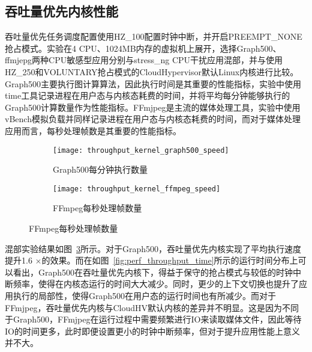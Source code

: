 \subsection{吞吐量优先内核性能}


吞吐量优先任务调度配置使用HZ\_100配置时钟中断，并开启PREEMPT\_NONE抢占模式。实验在4 CPU、1024MB内存的虚拟机上展开，选择Graph500、ffmjepg两种CPU敏感型应用分别与stress\_ng CPU干扰应用混部，并与使用HZ\_250和VOLUNTARY抢占模式的CloudHypervisor默认Linux内核进行比较。Graph500主要执行图计算算法，因此执行时间是其重要的性能指标，实验中使用time工具记录进程在用户态与内核态耗费的时间，并将平均每分钟能够执行的Graph500计算数量作为性能指标。FFmjpeg是主流的媒体处理工具，实验中使用vBench模拟负载并同样记录进程在用户态与内核态耗费的时间，而对于媒体处理应用而言，每秒处理帧数是其重要的性能指标。

\begin{figure}[H]
    \centering
    \begin{subfigure}[b]{0.35\textwidth}
        \texttt{[image: throughput\_kernel\_graph500\_speed]}
        \caption{\quad Graph500每分钟执行数量}
        \label{fig:throughput_kernel_graph500_speed}
    \end{subfigure}
    \begin{subfigure}[b]{0.35\textwidth}
        \texttt{[image: throughput\_kernel\_ffmpeg\_speed]}
        \caption{\quad FFmpeg每秒处理帧数量}
        \label{fig:throughput_kernel_ffmpeg_speed}
    \end{subfigure}
    \label{fig:perf_throughput}
\end{figure}

混部实验结果如图~\ref{fig:perf_throughput}所示。对于Graph500，吞吐量优先内核实现了平均执行速度提升1.6 $\times$的效果。而在如图~\ref{fig:perf_throughput_time}所示的运行时间分布上可以看出，Graph500在吞吐量优先内核下，得益于保守的抢占模式与较低的时钟中断频率，使得在内核态运行的时间大大减少。同时，更少的上下文切换也提升了应用执行的局部性，使得Graph500在用户态的运行时间也有所减少。而对于FFmjpeg，吞吐量优先内核与CloudHV默认内核的差异并不明显。这是因为不同于Graph500，FFmjpeg在运行过程中需要频繁进行IO来读取媒体文件，因此等待IO的时间更多，此时即便设置更小的时钟中断频率，但对于提升应用性能上意义并不大。

